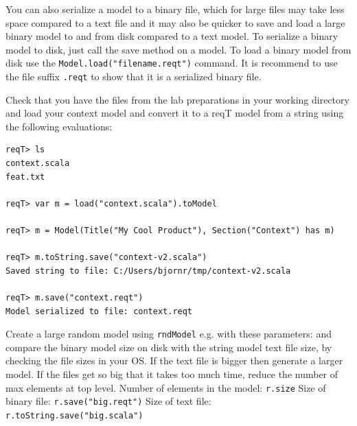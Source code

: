 \documentclass[11pt]{article}
\begin{document}
You can also serialize a model to a binary file, which for large files may take less space compared to a text file and it may also be quicker to save and load a large binary model to and from disk compared to a text model. To serialize a binary model to disk, just call the save method on a model. To load a binary model from disk use the \verb+Model.load("filename.reqt")+ command. It is recommend to use the file suffix \verb+.reqt+ to show that it is a serialized binary file.

\begin{framed}\noindent
Check that you have the files from the lab preparations in your working directory and load your context model and convert it to a reqT model from a string using the following evaluations: 
{\scriptsize \begin{verbatim}
reqT> ls
context.scala
feat.txt

reqT> var m = load("context.scala").toModel

reqT> m = Model(Title("My Cool Product"), Section("Context") has m)

reqT> m.toString.save("context-v2.scala")
Saved string to file: C:/Users/bjornr/tmp/context-v2.scala

reqT> m.save("context.reqt")
Model serialized to file: context.reqt
\end{verbatim}}
\noindent Create a large random model using \verb+rndModel+ e.g. with these parameters:  \newline and compare the binary model size on disk with the string model text file size, by checking the file sizes in your OS. If the text file is bigger then generate a larger model.  If the files get so big that it takes too much time, reduce the number of max elements at top level.\newline
\newline Number of elements in the model: {\footnotesize\verb+r.size+} \underline{\hspace{2cm}} 
\newline Size of binary file: {\footnotesize\verb+r.save("big.reqt")+}  \underline{\hspace{2cm}} 
\newline Size of text file: {\footnotesize\verb+r.toString.save("big.scala")+} \underline{\hspace{2cm}}
\end{framed}
\end{document}
